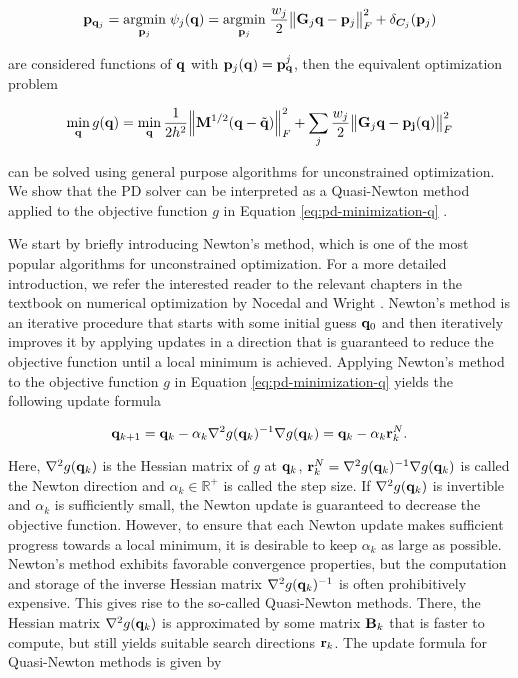 \[
    \mathbf{p}_{\mathbf{q}_j} 
    = \underset{\mathbf{p}_j}{\operatorname{argmin}}\; \psi_j(\mathbf{q}) 
    = \underset{\mathbf{p}_j}{\operatorname{argmin}}\; \frac{w_j}{2} \norm{\mathbf{G}_j\mathbf{q} - \mathbf{p}_j}^2_F + \delta_{\bm{C}_j}(\mathbf{p}_j)
\]

\noindent are considered functions of $\mathbf{q}$ with $\mathbf{p}_j(\mathbf{q}) = \mathbf{p}^j_{\mathbf{q}}$, then the equivalent optimization problem

\begin{equation}\label{eq:pd-minimization-q}
    \min_{\mathbf{q}} g(\mathbf{q}) = 
    \min_{\mathbf{q}} \frac{1}{2h^2} \norm{\mathbf{M}^{1/2}(\mathbf{q} - \tilde{\mathbf{q}})}^2_F + \sum_j \frac{w_j}{2} \norm{\mathbf{G}_j\mathbf{q}
    - \mathbf{p_j}(\mathbf{q})}^2_F
\end{equation}

\noindent can be solved using general purpose algorithms for unconstrained optimization. We show that the PD solver can be interpreted as a Quasi-Newton 
method applied to the objective function $g$ in Equation \ref{eq:pd-minimization-q} \cite{liu2017}.

We start by briefly introducing Newton's method, which is one of the most popular algorithms for unconstrained optimization. For a more detailed introduction, 
we refer the interested reader to the relevant chapters in the textbook on numerical optimization by Nocedal and Wright \cite{nocedal2006}. Newton's method 
is an iterative procedure that starts with some initial guess $\mathbf{q}_0$ and then iteratively improves it by applying updates in a direction that is 
guaranteed to reduce the objective function until a local minimum is achieved. Applying Newton's method to the objective function $g$ in Equation 
\ref{eq:pd-minimization-q} yields the following update formula 

\begin{equation}\label{eq:pd-newton-update}
    \mathbf{q}_{k+1} = \mathbf{q}_k - \alpha_k \nabla^2 g(\mathbf{q}_k)^{-1} \nabla g(\mathbf{q}_k) = \mathbf{q}_k - \alpha_k \mathbf{r}^N_k.
\end{equation}

\noindent Here, $\nabla^2 g(\mathbf{q}_k)$ is the Hessian matrix of $g$ at $\mathbf{q}_k$, $\mathbf{r}^N_k = \nabla^2 g(\mathbf{q}_k)^{-1} \nabla g(\mathbf{q}_k)$ 
is called the Newton direction and $\alpha_k \in \mathbb{R}^+$ is called the step size. If $\nabla^2 g(\mathbf{q}_k)$ is invertible and $\alpha_k$ is 
sufficiently small, the Newton update is guaranteed to decrease the objective function. However, to ensure that each Newton update makes sufficient progress 
towards a local minimum, it is desirable to keep $\alpha_k$ as large as possible. Newton's method exhibits favorable convergence properties, but the computation 
and storage of the inverse Hessian matrix $\nabla^2 g(\mathbf{q}_k)^{-1}$ is often prohibitively expensive. This gives rise to the so-called Quasi-Newton methods. 
There, the Hessian matrix $\nabla^2 g(\mathbf{q}_k)$ is approximated by some matrix $\mathbf{B}_k$ that is faster to compute, but still yields suitable search directions 
$\mathbf{r}_k$. The update formula for Quasi-Newton methods is given by

